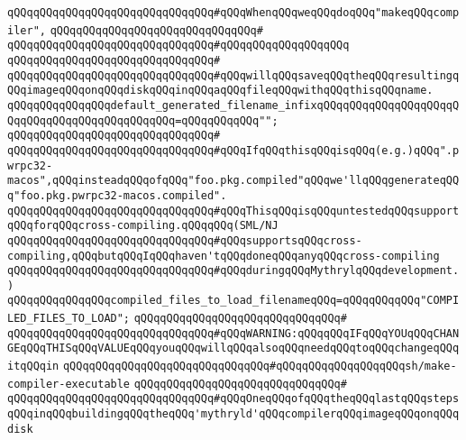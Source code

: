 \verb|qQQqqQQqqQQqqQQqqQQqqQQqqQQqqQQq#qQQqWhenqQQqweqQQqdoqQQq"makeqQQqcompiler",|\newline
\verb|qQQqqQQqqQQqqQQqqQQqqQQqqQQqqQQq#|\newline
\verb|qQQqqQQqqQQqqQQqqQQqqQQqqQQqqQQq#qQQqqQQqqQQqqQQqqQQq|\newline
\verb|qQQqqQQqqQQqqQQqqQQqqQQqqQQqqQQq#|\newline
\verb|qQQqqQQqqQQqqQQqqQQqqQQqqQQqqQQq#qQQqwillqQQqsaveqQQqtheqQQqresultingqQQqimageqQQqonqQQqdiskqQQqinqQQqaqQQqfileqQQqwithqQQqthisqQQqname.|\newline
\newline
\newline
\newline
\verb|qQQqqQQqqQQqqQQqdefault_generated_filename_infixqQQqqQQqqQQqqQQqqQQqqQQqqQQqqQQqqQQqqQQqqQQqqQQq=qQQqqQQqqQQq"";|\newline
\verb|qQQqqQQqqQQqqQQqqQQqqQQqqQQqqQQq#|\newline
\verb|qQQqqQQqqQQqqQQqqQQqqQQqqQQqqQQq#qQQqIfqQQqthisqQQqisqQQq(e.g.)qQQq".pwrpc32-macos",qQQqinsteadqQQqofqQQq"foo.pkg.compiled"qQQqwe'llqQQqgenerateqQQq"foo.pkg.pwrpc32-macos.compiled".|\newline
\verb|qQQqqQQqqQQqqQQqqQQqqQQqqQQqqQQq#qQQqThisqQQqisqQQquntestedqQQqsupportqQQqforqQQqcross-compiling.qQQqqQQq(SML/NJ|\newline
\verb|qQQqqQQqqQQqqQQqqQQqqQQqqQQqqQQq#qQQqsupportsqQQqcross-compiling,qQQqbutqQQqIqQQqhaven'tqQQqdoneqQQqanyqQQqcross-compiling|\newline
\verb|qQQqqQQqqQQqqQQqqQQqqQQqqQQqqQQq#qQQqduringqQQqMythrylqQQqdevelopment.)|\newline
\newline
\verb|qQQqqQQqqQQqqQQqcompiled_files_to_load_filenameqQQq=qQQqqQQqqQQq"COMPILED_FILES_TO_LOAD";|\newline
\verb|qQQqqQQqqQQqqQQqqQQqqQQqqQQqqQQq#|\newline
\verb|qQQqqQQqqQQqqQQqqQQqqQQqqQQqqQQq#qQQqWARNING:qQQqqQQqIFqQQqYOUqQQqCHANGEqQQqTHISqQQqVALUEqQQqyouqQQqwillqQQqalsoqQQqneedqQQqtoqQQqchangeqQQqitqQQqin|\newline
\verb|qQQqqQQqqQQqqQQqqQQqqQQqqQQqqQQq#qQQqqQQqqQQqqQQqqQQqsh/make-compiler-executable|\newline
\verb|qQQqqQQqqQQqqQQqqQQqqQQqqQQqqQQq#|\newline
\verb|qQQqqQQqqQQqqQQqqQQqqQQqqQQqqQQq#qQQqOneqQQqofqQQqtheqQQqlastqQQqstepsqQQqinqQQqbuildingqQQqtheqQQq'mythryld'qQQqcompilerqQQqimageqQQqonqQQqdisk|\newline
